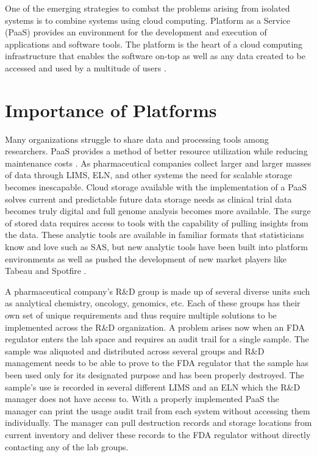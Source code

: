 \documentclass[sigconf]{acmart}
\begin{document}
One of the emerging strategies to combat the problems arising from isolated systems is to combine systems using cloud computing. Platform as a Service (PaaS) provides an environment for the development and execution of applications and software tools. The platform is the heart of a cloud computing infrastructure that enables the software on-top as well as any data created to be accessed and used by a multitude of users \cite{Ojala}.

\section{Importance of Platforms}	
Many organizations struggle to share data and processing tools among researchers. PaaS provides a method of better resource utilization while reducing maintenance costs \cite{Oh}. As pharmaceutical companies collect larger and larger masses of data through LIMS, ELN, and other systems the need for scalable storage becomes inescapable. Cloud storage available with the implementation of a PaaS solves current and predictable future data storage needs as clinical trial data becomes truly digital and full genome analysis becomes more available. The surge of stored data requires access to tools with the capability of pulling insights from the data. These analytic tools are available in familiar formats that statisticians know and love such as SAS, but new analytic tools have been built into platform environments as well as pushed the development of new market players like Tabeau and Spotfire \cite{Talia}.

A pharmaceutical company's R\&D group is made up of several diverse units such as analytical chemistry, oncology, genomics, etc. Each of these groups has their own set of unique requirements and thus require multiple solutions to be implemented across the R\&D organization. A problem arises now when an FDA regulator enters the lab space and requires an audit trail for a single sample. The sample was aliquoted and distributed across several groups and R\&D management needs to be able to prove to the FDA regulator that the sample has been used only for its designated purpose and has been properly destroyed. The sample's use is recorded in several different LIMS and an ELN which the R\&D manager does not have access to. With a properly implemented PaaS the manager can print the usage audit trail from each system without accessing them individually. The manager can pull destruction records and storage locations from current inventory and deliver these records to the FDA regulator without directly contacting any of the lab groups.
\end{document}
